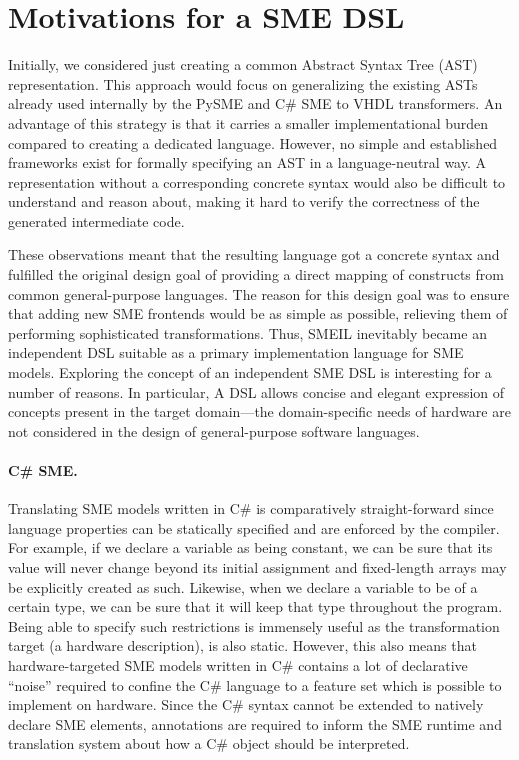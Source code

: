 \section{Motivations for a SME DSL}
\label{sec:smemot}

Initially, we considered just creating a common Abstract Syntax Tree (AST)
representation. This approach would focus on generalizing the existing ASTs
already used internally by the PySME and C\# SME to VHDL transformers. An
advantage of this strategy is that it carries a smaller implementational burden
compared to creating a dedicated language. However, no simple and established
frameworks exist for formally specifying an AST in a language-neutral way. A
representation without a corresponding concrete syntax would also be difficult
to understand and reason about, making it hard to verify the correctness of the
generated intermediate code.

These observations meant that the resulting language got a concrete syntax
and fulfilled the original design goal of providing a direct mapping of
constructs from common general-purpose languages. The reason for this design
goal was to ensure that adding new SME frontends would be as simple as possible,
relieving them of performing sophisticated transformations. Thus, SMEIL
inevitably became an independent DSL suitable as a primary implementation
language for SME models. Exploring the concept of an independent SME DSL is
interesting for a number of reasons. In particular, A DSL allows concise and
elegant expression of concepts present in the target domain---the
domain-specific needs of hardware are not considered in the design of
general-purpose software languages.

\paragraph{C\# SME.}
Translating SME models written in C\# is comparatively straight-forward since
language properties can be statically specified and are enforced by the
compiler. For example, if we declare a variable as being constant, we can be
sure that its value will never change beyond its initial assignment and
fixed-length arrays may be explicitly created as such. Likewise, when we declare
a variable to be of a certain type, we can be sure that it will keep that type
throughout the program. Being able to specify such restrictions is immensely
useful as the transformation target (a hardware description), is also
static. However, this also means that hardware-targeted SME models written in
C\# contains a lot of declarative ``noise'' required to confine the C\# language
to a feature set which is possible to implement on hardware. Since the C\#
syntax cannot be extended to natively declare SME elements, annotations are
required to inform the SME runtime and translation system about how a C\# object
should be interpreted.


